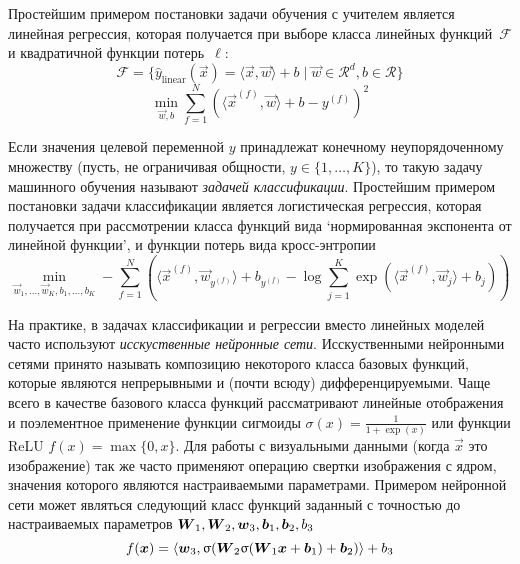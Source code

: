 Простейшим примером постановки задачи обучения с учителем является линейная регрессия, которая получается при выборе класса линейных функций~$\mathcal{F}$ и квадратичной функции потерь~$\ell$: 
\begin{equation}
\label{eq:linear-model}
\mathcal{F} = \{\widehat{y}_{\text{linear}}(\vec{x}) = \langle \vec{x}, \vec{w} \rangle + b \mid \vec{w} \in \mathcal{R}^d, b \in \mathcal{R}\}
\end{equation}
\begin{equation}
\label{eq:linear-loss}
\min_{\vec{w}, b}\sum_{f=1}^N \left(\langle \vec{x}^{(f)}, \vec{w} \rangle + b - y^{(f)}\right)^2%
\end{equation}

Если значения целевой переменной $y$ принадлежат конечному неупорядоченному множеству (пусть, не ограничивая общности, $y \in \{1, \ldots, K\}$), то такую задачу машинного обучения называют \emph{задачей классификации}. Простейшим примером постановки задачи классификации является логистическая регрессия, которая получается при рассмотрении класса функций вида `нормированная экспонента от линейной функции', и функции потерь вида кросс-энтропии
\begin{equation}
\min_{\vec{w}_1, \ldots, \vec{w}_K, b_1, \ldots, b_K} - \sum_{f=1}^N \left (\langle \vec{x}^{(f)}, \vec{w}_{y^{(f)}} \rangle + b_{y^{(f)}} - \log \sum_{j=1}^K \exp\left(\langle \vec{x}^{(f)}, \vec{w}_j \rangle + b_j\right ) \right )%
\end{equation}

На практике, в задачах классификации и регрессии вместо линейных моделей часто используют \emph{исскуственные нейронные сети}. Исскуственными нейронными сетями принято называть композицию некоторого класса базовых функций, которые являются непрерывными и (почти всюду) дифференцируемыми. Чаще всего в качестве базового класса функций рассматривают линейные отображения и поэлементное применение функции сигмоиды $\sigma(x) = \frac{1}{1 + \exp(x)}$ или функции ReLU $f(x) = \max\{0, x\}$. Для работы с визуальными данными (когда $\vec{x}$ это изображение) так же часто применяют операцию свертки изображения с ядром, значения которого являются настраиваемыми параметрами. Примером нейронной сети может являться следующий класс функций заданный с точностью до настраиваемых параметров $\boldsymbol{W}_1, \boldsymbol{W}_2, \boldsymbol{w}_3, \boldsymbol{b}_1, \boldsymbol{b}_2, b_3$
\[
f(\boldsymbol{x}) = \langle \boldsymbol{w}_3, \upsigma(\boldsymbol{W}_2 \upsigma(\boldsymbol{W}_1 \boldsymbol{x} + \boldsymbol{b}_1) + \boldsymbol{b}_2) \rangle + b_3
\]


